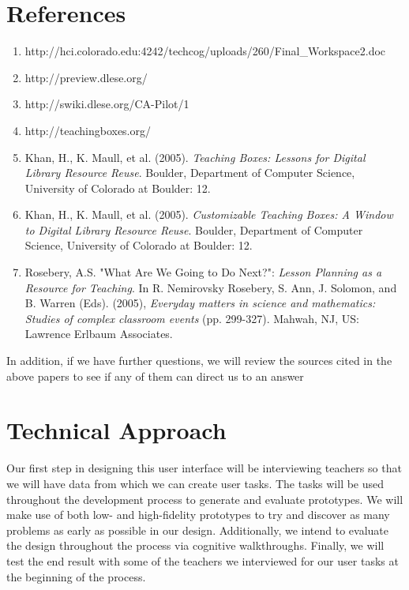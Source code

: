 \documentclass[11pt,letter]{article}
\begin{document}
\section{References}
\begin{enumerate}
	\item http://hci.colorado.edu:4242/techcog/uploads/260/Final\_Workspace2.doc

	\item http://preview.dlese.org/

	\item http://swiki.dlese.org/CA-Pilot/1

	\item http://teachingboxes.org/

	\item Khan, H., K. Maull, et al. (2005). \textit{Teaching Boxes: Lessons for
		Digital Library Resource Reuse}. Boulder, Department of Computer
		Science, University of Colorado at Boulder: 12.

	\item Khan, H., K. Maull, et al. (2005). \textit{Customizable Teaching
		Boxes: A Window to Digital Library Resource Reuse}. Boulder, Department
		of Computer Science, University of Colorado at Boulder: 12.

	\item Rosebery, A.S. "What Are We Going to Do Next?": \textit{Lesson
		Planning as a Resource for Teaching}.  In R. Nemirovsky Rosebery, S.
		Ann, J. Solomon, and B. Warren (Eds). (2005), \textit{Everyday matters
		in science and mathematics: Studies of complex classroom events} (pp.
		299-327). Mahwah, NJ, US: Lawrence Erlbaum Associates.

\end{enumerate}

In addition, if we have further questions, we will review the sources cited in
the above papers to see if any of them can direct us to an answer

\section{Technical Approach}

Our first step in designing this user interface will be interviewing teachers so
that we will have data from which we can create user tasks. The tasks will be
used throughout the development process to generate and evaluate prototypes. We
will make use of both low- and high-fidelity prototypes to try and discover as
many problems as early as possible in our design. Additionally, we intend to
evaluate the design throughout the process via cognitive walkthroughs. Finally,
we will test the end result with some of the teachers we interviewed for our
user tasks at the beginning of the process.
\end{document}
